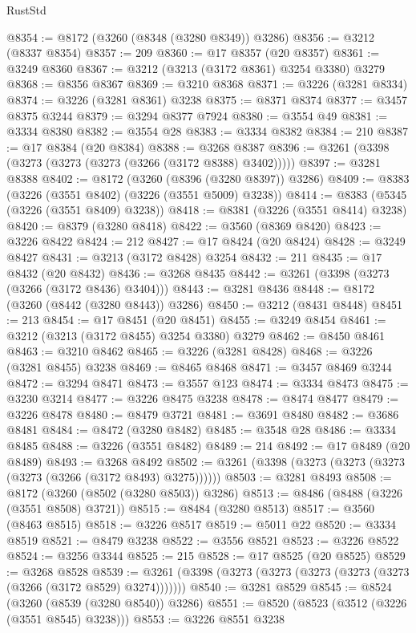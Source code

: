 \begin{lexlean}{RustStd}
\begin{coremodule}
@8354 := @8172 (@3260 (@8348 (@3280 @8349)) @3286)
@8356 := @3212 (@8337 @8354)
@8357 := 209
@8360 := @17 @8357 (@20 @8357)
@8361 := @3249 @8360
@8367 := @3212 (@3213 (@3172 @8361) @3254 @3380) @3279
@8368 := @8356 @8367
@8369 := @3210 @8368
@8371 := @3226 (@3281 @8334)
@8374 := @3226 (@3281 @8361) @3238
@8375 := @8371 @8374
@8377 := @3457 @8375 @3244
@8379 := @3294 @8377 @7924
@8380 := @3554 @49
@8381 := @3334 @8380
@8382 := @3554 @28
@8383 := @3334 @8382
@8384 := 210
@8387 := @17 @8384 (@20 @8384)
@8388 := @3268 @8387
@8396 := @3261 (@3398 (@3273 (@3273 (@3273 (@3266 (@3172 @8388) @3402)))))
@8397 := @3281 @8388
@8402 := @8172 (@3260 (@8396 (@3280 @8397)) @3286)
@8409 := @8383 (@3226 (@3551 @8402) (@3226 (@3551 @5009) @3238))
@8414 := @8383 (@5345 (@3226 (@3551 @8409) @3238))
@8418 := @8381 (@3226 (@3551 @8414) @3238)
@8420 := @8379 (@3280 @8418)
@8422 := @3560 (@8369 @8420)
@8423 := @3226 @8422
@8424 := 212
@8427 := @17 @8424 (@20 @8424)
@8428 := @3249 @8427
@8431 := @3213 (@3172 @8428) @3254
@8432 := 211
@8435 := @17 @8432 (@20 @8432)
@8436 := @3268 @8435
@8442 := @3261 (@3398 (@3273 (@3266 (@3172 @8436) @3404)))
@8443 := @3281 @8436
@8448 := @8172 (@3260 (@8442 (@3280 @8443)) @3286)
@8450 := @3212 (@8431 @8448)
@8451 := 213
@8454 := @17 @8451 (@20 @8451)
@8455 := @3249 @8454
@8461 := @3212 (@3213 (@3172 @8455) @3254 @3380) @3279
@8462 := @8450 @8461
@8463 := @3210 @8462
@8465 := @3226 (@3281 @8428)
@8468 := @3226 (@3281 @8455) @3238
@8469 := @8465 @8468
@8471 := @3457 @8469 @3244
@8472 := @3294 @8471
@8473 := @3557 @123
@8474 := @3334 @8473
@8475 := @3230 @3214
@8477 := @3226 @8475 @3238
@8478 := @8474 @8477
@8479 := @3226 @8478
@8480 := @8479 @3721
@8481 := @3691 @8480
@8482 := @3686 @8481
@8484 := @8472 (@3280 @8482)
@8485 := @3548 @28
@8486 := @3334 @8485
@8488 := @3226 (@3551 @8482)
@8489 := 214
@8492 := @17 @8489 (@20 @8489)
@8493 := @3268 @8492
@8502 := @3261 (@3398 (@3273 (@3273 (@3273 (@3273 (@3266 (@3172 @8493) @3275))))))
@8503 := @3281 @8493
@8508 := @8172 (@3260 (@8502 (@3280 @8503)) @3286)
@8513 := @8486 (@8488 (@3226 (@3551 @8508) @3721))
@8515 := @8484 (@3280 @8513)
@8517 := @3560 (@8463 @8515)
@8518 := @3226 @8517
@8519 := @5011 @22
@8520 := @3334 @8519
@8521 := @8479 @3238
@8522 := @3556 @8521
@8523 := @3226 @8522
@8524 := @3256 @3344
@8525 := 215
@8528 := @17 @8525 (@20 @8525)
@8529 := @3268 @8528
@8539 := @3261 (@3398 (@3273 (@3273 (@3273 (@3273 (@3273 (@3266 (@3172 @8529) @3274)))))))
@8540 := @3281 @8529
@8545 := @8524 (@3260 (@8539 (@3280 @8540)) @3286)
@8551 := @8520 (@8523 (@3512 (@3226 (@3551 @8545) @3238)))
@8553 := @3226 @8551 @3238

\end{coremodule}
\end{lexlean}
